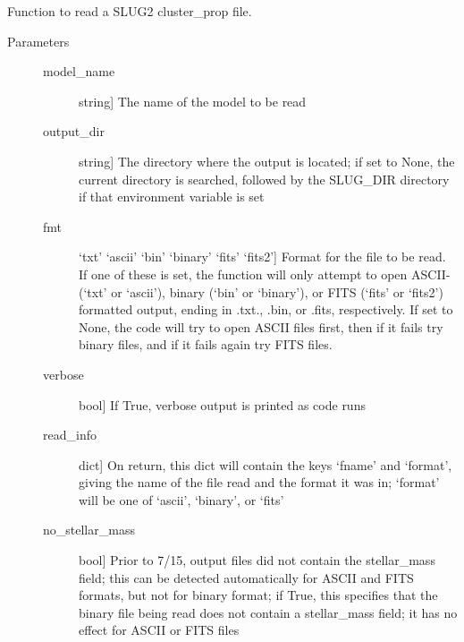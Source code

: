 \documentclass[letterpaper,10pt,english]{sphinxmanual}
\begin{document}

\begin{fulllineitems}
\label{slugpy:slugpy.read_cluster_prop}
Function to read a SLUG2 cluster\_prop file.
\begin{description}
\item[{Parameters}] \leavevmode\begin{description}
\item[{model\_name}] \leavevmode{[}string{]}
The name of the model to be read

\item[{output\_dir}] \leavevmode{[}string{]}
The directory where the output is located; if set to None,
the current directory is searched, followed by the SLUG\_DIR
directory if that environment variable is set

\item[{fmt}] \leavevmode{[}`txt' \textbar{} `ascii' \textbar{} `bin' \textbar{} `binary' \textbar{} `fits' \textbar{} `fits2'{]}
Format for the file to be read. If one of these is set, the
function will only attempt to open ASCII-(`txt' or `ascii'), 
binary (`bin' or `binary'), or FITS (`fits' or `fits2')
formatted output, ending in .txt., .bin, or .fits,
respectively. If set to None, the code will try to open
ASCII files first, then if it fails try binary files, and if
it fails again try FITS files.

\item[{verbose}] \leavevmode{[}bool{]}
If True, verbose output is printed as code runs

\item[{read\_info}] \leavevmode{[}dict{]}
On return, this dict will contain the keys `fname' and
`format', giving the name of the file read and the format it
was in; `format' will be one of `ascii', `binary', or `fits'

\item[{no\_stellar\_mass}] \leavevmode{[}bool{]}
Prior to 7/15, output files did not contain the stellar\_mass
field; this can be detected automatically for ASCII and FITS
formats, but not for binary format; if True, this specifies
that the binary file being read does not contain a
stellar\_mass field; it has no effect for ASCII or FITS files

\end{description}


\end{description}
\end{fulllineitems}
\end{document}
